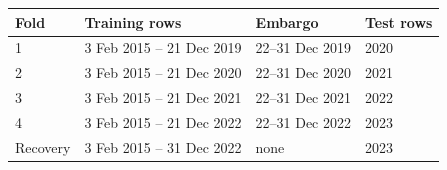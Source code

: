 \begin{tabular}{@{}llll@{}}
\toprule
Fold & Training rows & Embargo & Test rows \\
\midrule
1 & 3 Feb 2015 -- 21 Dec 2019 & 22--31 Dec 2019 & 2020 \\
2 & 3 Feb 2015 -- 21 Dec 2020 & 22--31 Dec 2020 & 2021 \\
3 & 3 Feb 2015 -- 21 Dec 2021 & 22--31 Dec 2021 & 2022 \\
4 & 3 Feb 2015 -- 21 Dec 2022 & 22--31 Dec 2022 & 2023 \\
\midrule
Recovery & 3 Feb 2015 -- 31 Dec 2022 & none & 2023 \\
\bottomrule
\end{tabular}
